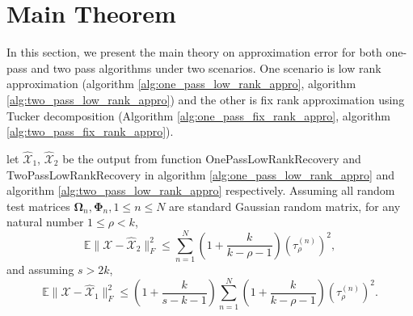 \section{Main Theorem}
In this section, we present the main theory on approximation error for both one-pass and two pass algorithms under two scenarios. One scenario is low rank approximation (algorithm \ref{alg:one_pass_low_rank_appro}, algorithm \ref{alg:two_pass_low_rank_appro}) and the other is fix rank approximation using Tucker decomposition (Algorithm \ref{alg:one_pass_fix_rank_appro}, algorithm \ref{alg:two_pass_fix_rank_appro}). 
\begin{thm}
\label{thm: low_rank_err}
let  $\hat{\mathscr{X}}_1$, $\hat{\mathscr{X}}_2$ be the output from function OnePassLowRankRecovery and TwoPassLowRankRecovery in algorithm \ref{alg:one_pass_low_rank_appro} and algorithm \ref{alg:two_pass_low_rank_appro} respectively. Assuming all random test matrices $\mathbf{\Omega}_n, \mathbf{\Phi}_n, 1\le n\le N$ are standard Gaussian random matrix, for any natural number $1\le \rho< k$, 
\begin{equation}
\mathbb{E}\| \mathscr{X} - \hat{\mathscr{X}}_2 \|_F^2 \leq  \sum_{n=1}^N \left(1+\frac{k}{k-\rho-1}\right)(\tau^{(n)}_\rho)^2, 
\end{equation}
and assuming $s>2k$, 
\begin{equation}
\mathbb{E}\| \mathscr{X} - \hat{\mathscr{X}}_1 \|_F^2  \le    \left(1+\frac{k}{s-k-1}\right) \sum_{n=1}^N \left(1+\frac{k}{k-\rho-1}\right)(\tau^{(n)}_\rho)^2. 
\end{equation}
\end{thm}
